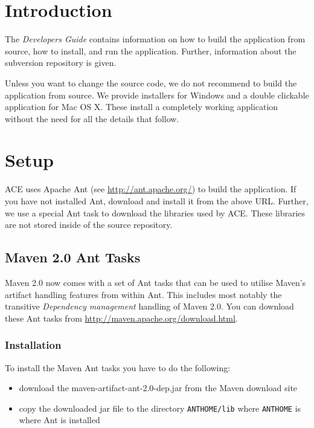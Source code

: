 \documentclass[11pt,a4paper]{article}
\begin{document}
\setlength{\parindent}{0pt}



\tableofcontents
\newpage


\section{Introduction}

The \emph{Developers Guide} contains information on how to build the application
from source, how to install, and run the application. Further, information
about the subversion repository is given.

Unless you want to change the source code, we do not recommend to build the
application from source. We provide installers for Windows and a double
clickable application for Mac OS X. These install a completely working
application without the need for all the details that follow.


\section{Setup}
ACE uses Apache Ant (see \href{http://ant.apache.org/}{http://ant.apache.org/})
to build the application. If you have not installed Ant, download and install
it from the above URL. Further, we use a special Ant task to download the
libraries used by ACE. These libraries are not stored inside of the source
repository.

\subsection{Maven 2.0 Ant Tasks}
Maven 2.0 now comes with a set of Ant tasks that can be used to utilise Maven's
artifact handling features from within Ant. This includes most notably the
transitive \emph{Dependency management} handling of Maven 2.0. You can
download these Ant tasks from 
\href{http://maven.apache.org/download.html}{http://maven.apache.org/download.html}.

\subsubsection{Installation}
To install the Maven Ant tasks you have to do the following:
\begin{itemize}
 \item download the maven-artifact-ant-2.0-dep.jar from the Maven download site
 \item copy the downloaded jar file to the directory \texttt{ANTHOME/lib} where \texttt{ANTHOME} is where Ant is installed
\end{itemize}
\end{document}

